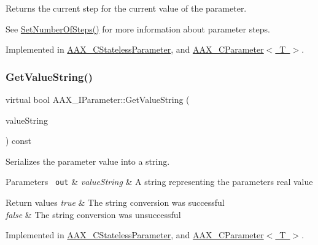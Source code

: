 Returns the current step for the current value of the parameter. 

See \mbox{\hyperlink{a01857_ac81903d0388a03045a57dd4c455b6f02}{Set\+Number\+Of\+Steps()}} for more information about parameter steps. 

Implemented in \mbox{\hyperlink{a01541_ad6393ac5ca6f3cf099b59853313db770}{A\+A\+X\+\_\+\+C\+Stateless\+Parameter}}, and \mbox{\hyperlink{a01537_a832da5dbb22198976ca7f060b13a6406}{A\+A\+X\+\_\+\+C\+Parameter$<$ T $>$}}.

\mbox{\label{a01857_a0b20c4210f4bb6e6f00de8817051dfb8}} 
\subsubsection{\texorpdfstring{GetValueString()}{GetValueString()}\hspace{0.1cm}{\footnotesize\ttfamily [1/2]}}
{\footnotesize\ttfamily virtual bool A\+A\+X\+\_\+\+I\+Parameter\+::\+Get\+Value\+String (\begin{DoxyParamCaption}\item[{\mbox{\hyperlink{a01573}{A\+A\+X\+\_\+\+C\+String}} $\ast$}]{value\+String }\end{DoxyParamCaption}) const\hspace{0.3cm}{\ttfamily [pure virtual]}}



Serializes the parameter value into a string. 


\begin{DoxyParams}[1]{Parameters}
\mbox{\texttt{ out}}  & {\em value\+String} & A string representing the parameter\textquotesingle{}s real value\\
\hline
\end{DoxyParams}

\begin{DoxyRetVals}{Return values}
{\em true} & The string conversion was successful \\
\hline
{\em false} & The string conversion was unsuccessful \\
\hline
\end{DoxyRetVals}


Implemented in \mbox{\hyperlink{a01541_ad5bdb6216462d9958da46b53ccf45351}{A\+A\+X\+\_\+\+C\+Stateless\+Parameter}}, and \mbox{\hyperlink{a01537_ae1dddbaf06ec0851dbf4eb09bad5b24f}{A\+A\+X\+\_\+\+C\+Parameter$<$ T $>$}}.

